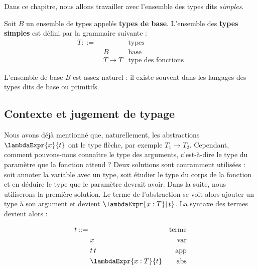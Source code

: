 Dans ce chapitre, nous allons travailler avec l'ensemble des types dits
\textit{simples}.

\begin{definition}
  \label{def:simply-typed-lambda-calculus-types}
  Soit $B$ un ensemble de types appelés \textbf{types de base}.
  L'ensemble des \textbf{types simples} est défini par la grammaire suivante :
  \begin{align*}
    T ::= & \, & \text{types} \\
          & \; B & \text{base} \\
          & \; T \rightarrow T & \text{type des fonctions}
  \end{align*}
\end{definition}

L'ensemble de base $B$ est assez naturel : il existe souvent dans les langages
des types dits de base ou primitifs.



\subsection*{Contexte et jugement de typage}

Nous avons déjà mentionné que, naturellement, les abstractions $\lambdaExpr{x}{t}$ ont le type
flèche, par exemple $T_{1} \rightarrow T_{2}$. Cependant, comment pouvons-nous
connaître le type des arguments, c'est-à-dire le type du paramètre que la
fonction attend ? Deux solutions sont couramment utilisées : soit annoter la
variable avec un type, soit étudier le type du corps de la fonction et
en déduire le type que le paramètre devrait avoir.
Dans la suite, nous utiliserons la première solution. Le terme de l'abstraction
se voit alors ajouter un type à son argument et devient $\lambdaExpr{x : T}{t}$.
La syntaxe des termes devient alors :

\begin{align*}
  \label{def:simply-typed-lambda-calculus-terms}
  t ::= & \, & \text{terme} \\
        & \; x & \text{var} \\
        & \; t \, t & \text{app} \\
        & \; \lambdaExpr{x : T}{t} & \text{abs}
\end{align*}

